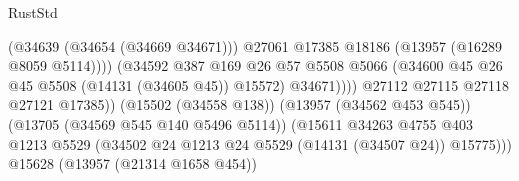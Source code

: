 \begin{lexlean}{RustStd}
\begin{coremodule}
                                                          (@34639 (@34654 (@34669 @34671)))
                                                          @27061
                                                          @17385
                                                          @18186
                                                          (@13957 (@16289 @8059 @5114))))
                                                      (@34592
                                                        @387
                                                        @169
                                                        @26
                                                        @57
                                                        @5508
                                                        @5066
                                                        (@34600
                                                          @45
                                                          @26
                                                          @45
                                                          @5508
                                                          (@14131 (@34605 @45))
                                                          @15572)
                                                        @34671))))
                                                @27112
                                                @27115
                                                @27118
                                                @27121
                                                @17385))
                                            (@15502 (@34558 @138))
                                            (@13957 (@34562 @453 @545))
                                            (@13705 (@34569 @545 @140 @5496 @5114))
                                            (@15611
                                              @34263
                                              @4755
                                              @403
                                              @1213
                                              @5529
                                              (@34502
                                                @24
                                                @1213
                                                @24
                                                @5529
                                                (@14131 (@34507 @24))
                                                @15775)))
                                          @15628
                                          (@13957 (@21314 @1658 @454))

\end{coremodule}
\end{lexlean}
